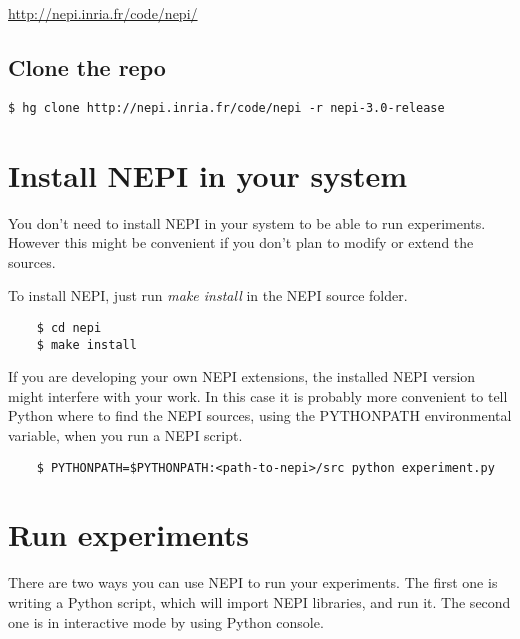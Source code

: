 \url{http://nepi.inria.fr/code/nepi/} 

\subsection{Clone the repo}

\begingroup
    \fontsize{10pt}{12pt}\selectfont

\begin{verbatim}
$ hg clone http://nepi.inria.fr/code/nepi -r nepi-3.0-release
\end{verbatim}

\endgroup

\section{Install NEPI in your system}

You don't need to install NEPI in your system to be able to run 
experiments. However this might be convenient if you don't 
plan to modify or extend the sources.

To install NEPI, just run \emph{make install} in the NEPI source
folder.

\begingroup
    \fontsize{10pt}{12pt}\selectfont

\begin{verbatim}
    $ cd nepi
    $ make install 
\end{verbatim}

\endgroup

If you are developing your own NEPI extensions, the installed 
NEPI version might interfere with your work.
In this case it is probably more convenient to tell
Python where to find the NEPI sources, using the PYTHONPATH
environmental variable, when you run a NEPI script.

\begingroup
    \fontsize{10pt}{12pt}\selectfont

\begin{verbatim}
    $ PYTHONPATH=$PYTHONPATH:<path-to-nepi>/src python experiment.py
\end{verbatim}

\endgroup

\section{Run experiments}

There are two ways you can use NEPI to run your experiments.
The first one is writing a Python script, which will import
NEPI libraries, and run it. 
The second one is in interactive mode by using Python console.

